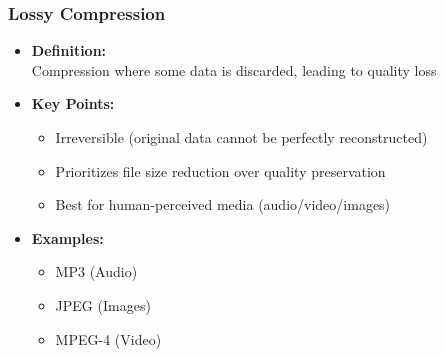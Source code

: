 \documentclass[10pt,aspectratio=43]{beamer}
\begin{document}
\begin{frame}
    \frametitle{\textcolor{myMaroon}{Lossy Compression}}
    \begin{itemize}
        \item \textcolor{myMaroon}{\textbf{Definition:}} \\
        Compression where some data is discarded, leading to quality loss
        
        \vspace{0.4cm}
        \item \textcolor{myMaroon}{\textbf{Key Points:}}
        \begin{itemize}
            \item Irreversible (original data cannot be perfectly reconstructed)
            \item Prioritizes file size reduction over quality preservation
            \item Best for human-perceived media (audio/video/images)
        \end{itemize}
        
        \vspace{0.4cm}
        \item \textcolor{myMaroon}{\textbf{Examples:}}
        \begin{itemize}
            \item \textcolor{myBlue}{MP3} (Audio)
            \item \textcolor{myBlue}{JPEG} (Images)
            \item \textcolor{myBlue}{MPEG-4} (Video)
        \end{itemize}
    \end{itemize}


\end{frame}
\end{document}
